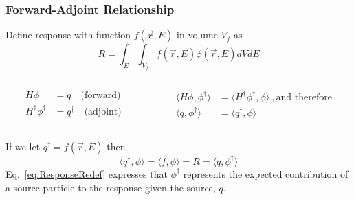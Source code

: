 \documentclass[xcolor=x11names,compress]{beamer}
\renewcommand{\(}{\begin{columns}}
\renewcommand{\)}{\end{columns}}
\newcommand{\<}[1]{\begin{column}{#1}}
\renewcommand{\>}{\end{column}}
\newcommand{\ve}[1]{\ensuremath{\vec{#1}}}
\begin{document}
\begin{frame}[fragile]
  \frametitle{Forward-Adjoint Relationship \cite{Wagner2007}}
Define response with function $f(\ve{r}, E)$ in volume $V_f$ as
%
\begin{equation}
 R = \int_E \int_{V_f} f(\ve{r}, E) \phi(\ve{r}, E) dV dE 
 \label{eq:Response}
\end{equation}
%
\begin{columns}
  \begin{column}{0.5\textwidth}
	\begin{align}
  	H\phi &= q \quad \text{(forward)}\nonumber \\
  	H^{\dagger} \phi^{\dagger} &= q^{\dagger} \quad 
  	\text{(adjoint)}\nonumber
  	\end{align}
  \end{column}
  \begin{column}{0.5\textwidth}
  	\begin{align}
  	\langle H\phi, \phi^{\dagger} \rangle &= \langle H^{\dagger} \phi^{\dagger}, \phi \rangle \:, \text{and therefore} \nonumber \\
  	\langle q, \phi^{\dagger} \rangle &= \langle q^{\dagger}, \phi \rangle \nonumber
  	\end{align}
  \end{column}
\end{columns}
\vspace*{1 em}
If we let $q^{\dagger} = f(\ve{r}, E)$ then
%
\begin{equation}
 \langle q^{\dagger}, \phi \rangle = \langle f, \phi \rangle = R = \langle q, \phi^{\dagger} \rangle
 \label{eq:ResponseRedef}
\end{equation}
%
Eq.\ \eqref{eq:ResponseRedef} expresses that $\phi^{\dagger}$ represents the expected contribution of a source particle to the response given the source, $q$.

\end{frame}
\end{document}
